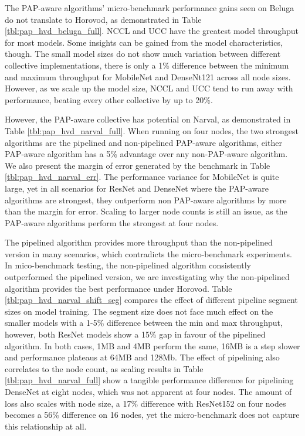 

The \gls{PAP}-aware algorithms' micro-benchmark performance gains seen on Beluga do not translate to Horovod, as demonstrated in Table \ref{tbl:pap_hvd_beluga_full}.
\gls{NCCL} and \gls{UCC} have the greatest model throughput for most models.
Some insights can be gained from the model characteristics, though.
The small model sizes do not show much variation between different collective implementations, there is only a 1\% difference between the minimum and maximum throughput for MobileNet and DenseNt121 across all node sizes. 
However, as we scale up the model size, \gls{NCCL} and \gls{UCC} tend to run away with performance, beating every other collective by up to 20\%.

However, the \gls{PAP}-aware collective has potential on Narval, as demonstrated in Table \ref{tbl:pap_hvd_narval_full}.
When running on four nodes, the two strongest algorithms are the pipelined and non-pipelined \gls{PAP}-aware algorithms, either \gls{PAP}-aware algorithm has a 5\% advantage over any non-\gls{PAP}-aware algorithm.
We also present the margin of error generated by the benchmark in Table \ref{tbl:pap_hvd_narval_err}.
The performance variance for MobileNet is quite large, yet in all scenarios for ResNet and DenseNet where the \gls{PAP}-aware algorithms are strongest, they outperform non \gls{PAP}-aware algorithms by more than the margin for error.
Scaling to larger node counts is still an issue, as the \gls{PAP}-aware algorithms perform the strongest at four nodes.




The pipelined algorithm provides more throughput than the non-pipelined version in many scenarios, which contradicts the micro-benchmark experiments.
In mico-benchmark testing, the non-pipelined algorithm consistently outperformed the pipelined version, we are investigating why the non-pipelined algorithm provides the best performance under Horovod.
Table \ref{tbl:pap_hvd_narval_shift_seg} compares the effect of different pipeline segment sizes on model training.
The segment size does not face much effect on the smaller models with a 1-5\% difference between the min and max throughput, however, both ResNet models show a 15\% gap in favour of the pipelined algorithm.
In both cases, 1MB and 4MB perform the same, 16MB is a step slower and performance plateaus at 64MB and 128Mb.
The effect of pipelining also correlates to the node count, as scaling results in Table \ref{tbl:pap_hvd_narval_full} show a tangible performance difference for pipelining DenseNet at eight nodes, which was not apparent at four nodes.
The amount of loss also scales with node size, a 17\% difference with ResNet152 on four nodes becomes a 56\% difference on 16 nodes, yet the micro-benchmark does not capture this relationship at all.

